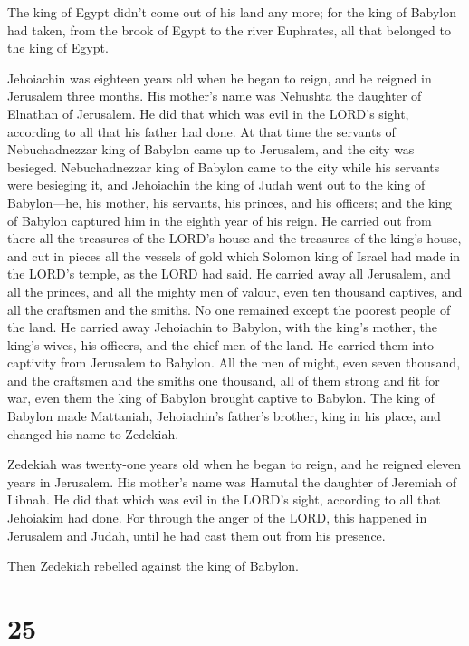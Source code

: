  The king of Egypt didn't come out of his land any more; for
the king of Babylon had taken, from the brook of Egypt to the river
Euphrates, all that belonged to the king of Egypt.

 Jehoiachin was eighteen years old when he began to reign,
and he reigned in Jerusalem three months. His mother's name was Nehushta
the daughter of Elnathan of Jerusalem.  He did that which
was evil in the LORD's sight, according to all that his father had done.
 At that time the servants of Nebuchadnezzar king of
Babylon came up to Jerusalem, and the city was besieged. 
Nebuchadnezzar king of Babylon came to the city while his servants were
besieging it,  and Jehoiachin the king of Judah went out to
the king of Babylon---he, his mother, his servants, his princes, and his
officers; and the king of Babylon captured him in the eighth year of his
reign.  He carried out from there all the treasures of the
LORD's house and the treasures of the king's house, and cut in pieces
all the vessels of gold which Solomon king of Israel had made in the
LORD's temple, as the LORD had said.  He carried away all
Jerusalem, and all the princes, and all the mighty men of valour, even
ten thousand captives, and all the craftsmen and the smiths. No one
remained except the poorest people of the land.  He carried
away Jehoiachin to Babylon, with the king's mother, the king's wives,
his officers, and the chief men of the land. He carried them into
captivity from Jerusalem to Babylon.  All the men of might,
even seven thousand, and the craftsmen and the smiths one thousand, all
of them strong and fit for war, even them the king of Babylon brought
captive to Babylon.  The king of Babylon made Mattaniah,
Jehoiachin's father's brother, king in his place, and changed his name
to Zedekiah.

 Zedekiah was twenty-one years old when he began to reign,
and he reigned eleven years in Jerusalem. His mother's name was Hamutal
the daughter of Jeremiah of Libnah.  He did that which was
evil in the LORD's sight, according to all that Jehoiakim had done.
 For through the anger of the LORD, this happened in
Jerusalem and Judah, until he had cast them out from his presence.

Then Zedekiah rebelled against the king of Babylon.

\hypertarget{section-24}{%
\section{25}\label{section-24}}

